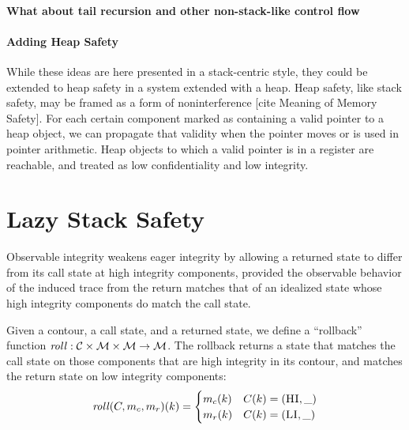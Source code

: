 \documentclass[acmsmall,review,anonymous]{acmart}\settopmatter{printfolios=true,printccs=false,printacmref=false}
\begin{document}

  \paragraph{What about tail recursion and other non-stack-like control flow}

  \paragraph{Adding Heap Safety}

    While these ideas are here presented in a stack-centric style, they could
    be extended to heap safety in a system extended with a heap. Heap safety,
    like stack safety, may be framed as a form of noninterference
    [cite Meaning of Memory Safety]. For each certain component marked as
    containing a valid pointer to a heap object, we can propagate that
    validity when the pointer moves or is used in pointer arithmetic. Heap
    objects to which a valid pointer is in a register are reachable, and
    treated as low confidentiality and low integrity.

\section{Lazy Stack Safety}
\label{sec:lazy}

      Observable integrity weakens eager integrity by allowing a returned state
      to differ from its call state at high integrity components, provided the
      observable behavior of the induced trace from the return matches that of
      an idealized state whose high integrity components do match the call
      state.

      Given a contour, a call state, and a returned state, we define a
      ``rollback'' function \(\mathit{roll} : {\mathcal C} \times {\mathcal M} \times
      {\mathcal M} \rightarrow {\mathcal M}\). The rollback returns a state that matches
      the call state on those components that are high integrity in its
      contour, and matches the return state on low integrity components:
      \[\mathit{roll}(C,m_c,m_r)(k) =
      \begin{cases}
        m_c(k) & C(k) = (\textsc{HI},\_) \\
        m_r(k) & C(k) = (\textsc{LI},\_) \\
      \end{cases}\]
\end{document}
